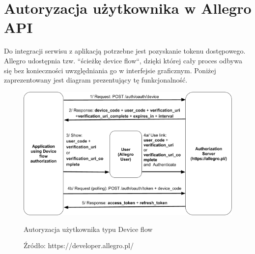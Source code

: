 
\section{Autoryzacja użytkownika w Allegro API}

Do integracji serwisu z aplikacją potrzebne jest pozyskanie tokenu dostępowego. Allegro udostępnia tzw. ``ścieżkę device flow``, dzięki której cały proces odbywa się bez konieczności uwzględniania go w interfejsie graficznym. Poniżej zaprezentowany jest diagram prezentujący tę funkcjonalność.\\

\begin{figure}[H]
	\centering
	\includegraphics[width=\linewidth]{device_flow.png}
	\caption{Autoryzacja użytkownika typu Device flow}
	\caption*{Źródło: {https://developer.allegro.pl/}}
\end{figure}


